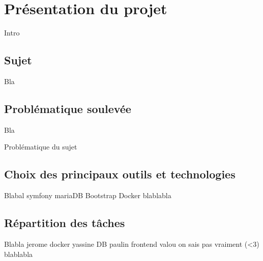 \chapter{Présentation du projet}

Intro\footnotemark\\

\section{Sujet}
Bla\\


\section{Problématique soulevée}

Bla

\begin{center}
Problématique du sujet
\end{center}

\section{Choix des principaux outils et technologies}

Blabal symfony mariaDB Bootstrap Docker blablabla

\section{Répartition des tâches}

Blabla jerome docker yassine DB paulin frontend valou on sais pas vraiment (<3) blablabla